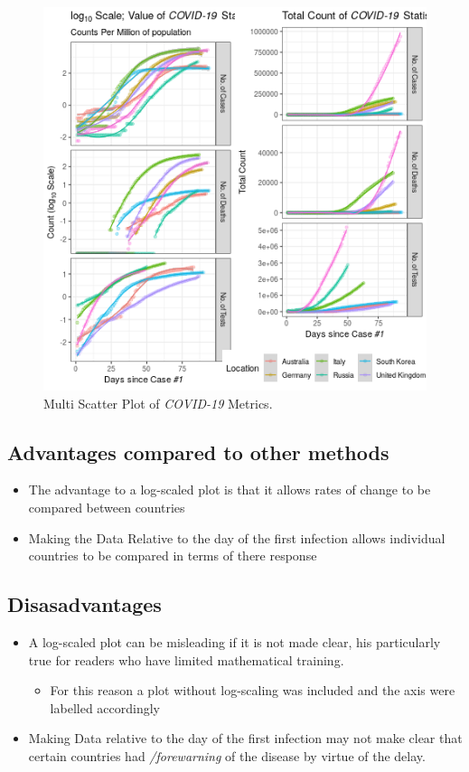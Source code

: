 \documentclass[11pt]{article}
\begin{document}
\begin{figure}[htbp]
\centering
\includegraphics[width=16cm]{fgrid.png}
\caption{\label{fig:org54b906e}Multi Scatter Plot of \emph{COVID-19} Metrics.}
\end{figure}


\subsection{Advantages compared to other methods}
\label{sec:org456bcd3}
\begin{itemize}
\item The advantage to a log-scaled plot is that it allows rates of change to be
compared between countries
\item Making the Data Relative to the day of the first infection allows individual
countries to be compared in terms of there response
\end{itemize}
\subsection{Disasadvantages}
\label{sec:orga4092e5}
\begin{itemize}
\item A log-scaled plot can be misleading if it is not made clear, his particularly
true for readers who have limited mathematical training.
\begin{itemize}
\item For this reason a plot without log-scaling was included and the axis were
labelled accordingly
\end{itemize}
\item Making Data relative to the day of the first infection may not make clear that
certain countries had \emph{/forewarning} of the disease by virtue of the delay.
\end{itemize}
\end{document}
